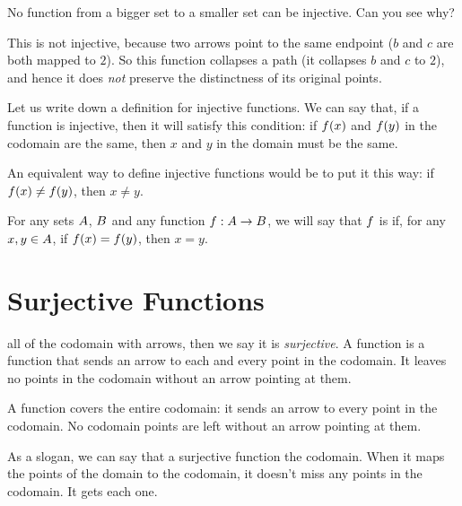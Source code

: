 \documentclass[../../../main.tex]{subfiles}
\begin{document}
\begin{ponder}
  No function from a bigger set to a smaller set can be injective. Can you see why?
\end{ponder}

This is not injective, because two arrows point to the same endpoint ($b$ and $c$ are both mapped to $2$). So this function collapses a path (it collapses $b$ and $c$ to $2$), and hence it does \emph{not} preserve the distinctness of its original points.

Let us write down a definition for injective functions. We can say that, if a function is injective, then it will satisfy this condition: if $f(x)$ and $f(y)$ in the codomain are the same, then $x$ and $y$ in the domain must be the same.

\begin{aside}
  \begin{remark}
    An equivalent way to define injective functions would be to put it this way: if $f(x) \not = f(y)$, then $x \not = y$.
  \end{remark}
\end{aside}

\begin{fdefinition}
  For any sets $A$, $B$ and any function $f: A \rightarrow B$, we will say that $f$ is  if, for any $x, y \in A$, if $f(x) = f(y)$, then $x = y$.
\end{fdefinition}


\section{Surjective Functions}

 all of the codomain with arrows, then we say it is \emph{surjective}. A  function is a function that sends an arrow to each and every point in the codomain. It leaves no points in the codomain without an arrow pointing at them. 

\begin{terminology}
  A  function covers the entire codomain: it sends an arrow to every point in the codomain. No codomain points are left without an arrow pointing at them.
\end{terminology}

As a slogan, we can say that a surjective function  the codomain. When it maps the points of the domain to the codomain, it doesn't miss any points in the codomain. It gets each one. 
\end{document}
